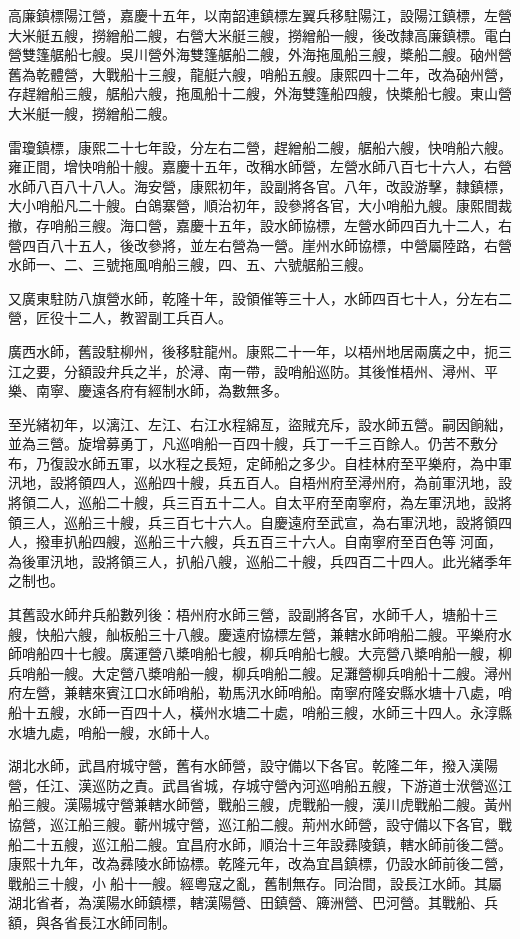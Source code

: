 \begin{pinyinscope}
高廉鎮標陽江營，嘉慶十五年，以南韶連鎮標左翼兵移駐陽江，設陽江鎮標，左營大米艇五艘，撈繒船二艘，右營大米艇三艘，撈繒船一艘，後改隸高廉鎮標。電白營雙篷艍船七艘。吳川營外海雙篷艍船二艘，外海拖風船三艘，槳船二艘。硇州營舊為乾體營，大戰船十三艘，龍艇六艘，哨船五艘。康熙四十二年，改為硇州營，存趕繒船三艘，艍船六艘，拖風船十二艘，外海雙篷船四艘，快槳船七艘。東山營大米艇一艘，撈繒船二艘。

雷瓊鎮標，康熙二十七年設，分左右二營，趕繒船二艘，艍船六艘，快哨船六艘。雍正間，增快哨船十艘。嘉慶十五年，改稱水師營，左營水師八百七十六人，右營水師八百八十八人。海安營，康熙初年，設副將各官。八年，改設游擊，隸鎮標，大小哨船凡二十艘。白鴿寨營，順治初年，設參將各官，大小哨船九艘。康熙間裁撤，存哨船三艘。海口營，嘉慶十五年，設水師協標，左營水師四百九十二人，右營四百八十五人，後改參將，並左右營為一營。崖州水師協標，中營屬陸路，右營水師一、二、三號拖風哨船三艘，四、五、六號艍船三艘。

又廣東駐防八旗營水師，乾隆十年，設領催等三十人，水師四百七十人，分左右二營，匠役十二人，教習副工兵百人。

廣西水師，舊設駐柳州，後移駐龍州。康熙二十一年，以梧州地居兩廣之中，扼三江之要，分額設弁兵之半，於潯、南一帶，設哨船巡防。其後惟梧州、潯州、平樂、南寧、慶遠各府有經制水師，為數無多。

至光緒初年，以漓江、左江、右江水程綿亙，盜賊充斥，設水師五營。嗣因餉絀，並為三營。旋增募勇丁，凡巡哨船一百四十艘，兵丁一千三百餘人。仍苦不敷分布，乃復設水師五軍，以水程之長短，定師船之多少。自桂林府至平樂府，為中軍汛地，設將領四人，巡船四十艘，兵五百人。自梧州府至潯州府，為前軍汛地，設將領二人，巡船二十艘，兵三百五十二人。自太平府至南寧府，為左軍汛地，設將領三人，巡船三十艘，兵三百七十六人。自慶遠府至武宣，為右軍汛地，設將領四人，撥車扒船四艘，巡船三十六艘，兵五百三十六人。自南寧府至百色等河面，為後軍汛地，設將領三人，扒船八艘，巡船二十艘，兵四百二十四人。此光緒季年之制也。

其舊設水師弁兵船數列後：梧州府水師三營，設副將各官，水師千人，塘船十三艘，快船六艘，舢板船三十八艘。慶遠府協標左營，兼轄水師哨船二艘。平樂府水師哨船四十七艘。廣運營八槳哨船七艘，柳兵哨船七艘。大亮營八槳哨船一艘，柳兵哨船一艘。大定營八槳哨船一艘，柳兵哨船二艘。足灘營柳兵哨船十二艘。潯州府左營，兼轄來賓江口水師哨船，勒馬汛水師哨船。南寧府隆安縣水塘十八處，哨船十五艘，水師一百四十人，橫州水塘二十處，哨船三艘，水師三十四人。永淳縣水塘九處，哨船一艘，水師十人。

湖北水師，武昌府城守營，舊有水師營，設守備以下各官。乾隆二年，撥入漢陽營，任江、漢巡防之責。武昌省城，存城守營內河巡哨船五艘，下游道士洑營巡江船三艘。漢陽城守營兼轄水師營，戰船三艘，虎戰船一艘，漢川虎戰船二艘。黃州協營，巡江船三艘。蘄州城守營，巡江船二艘。荊州水師營，設守備以下各官，戰船二十五艘，巡江船二艘。宜昌府水師，順治十三年設彞陵鎮，轄水師前後二營。康熙十九年，改為彞陵水師協標。乾隆元年，改為宜昌鎮標，仍設水師前後二營，戰船三十艘，小船十一艘。經粵寇之亂，舊制無存。同治間，設長江水師。其屬湖北省者，為漢陽水師鎮標，轄漢陽營、田鎮營、簰洲營、巴河營。其戰船、兵額，與各省長江水師同制。


\end{pinyinscope}
